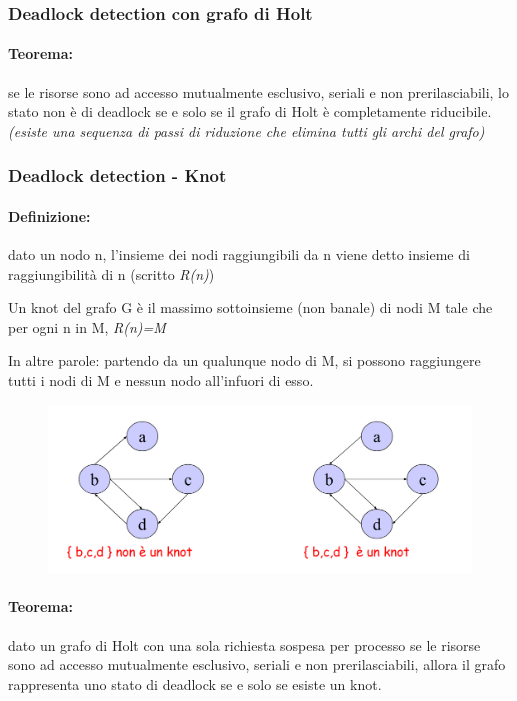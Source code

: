 \subsubsection{Deadlock detection con grafo di Holt}
\paragraph{Teorema:} se le risorse sono ad accesso mutualmente esclusivo, seriali e non prerilasciabili,  lo stato non è di deadlock se e solo se il grafo di Holt è completamente
riducibile. \textit{(esiste una sequenza di passi di riduzione che elimina tutti gli archi del grafo)}

\subsubsection{Deadlock detection - Knot}

\paragraph{Definizione:} dato un nodo n, l'insieme dei nodi raggiungibili da n viene detto insieme di raggiungibilità di n (scritto \textit{R(n)})

 Un knot del grafo G è il massimo sottoinsieme (non banale) di nodi M tale che per ogni n in M, \textit{R(n)=M}
 
In altre parole: partendo da un qualunque nodo di M, si possono raggiungere tutti i nodi di M e nessun nodo all'infuori di esso.

\begin{figure} [h]
    \centering
    \includegraphics[width=0.6\linewidth]{Images/Screenshot 2025-01-14 at 17-54-33 so-04-risorse - so-04-risorse.pdf.png}
\end{figure}

\paragraph{Teorema:} dato un grafo di Holt con una sola richiesta sospesa per processo
se le risorse sono ad accesso mutualmente esclusivo, seriali e non
prerilasciabili,  allora il grafo rappresenta uno stato di deadlock se e solo se esiste un knot.

